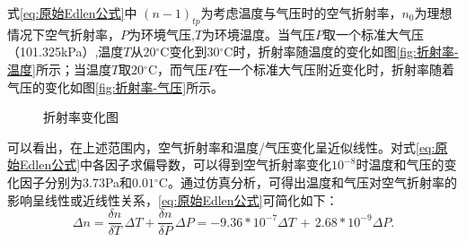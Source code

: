 式\eqref{eq:原始Edlen公式}中 \((n-1)_{tp}\)为考虑温度与气压时的空气折射率，\(n_0\)为理想情况下空气折射率，\(P\)为环境气压,\(T\)为环境温度。当气压\(P\)取一个标准大气压（101.325kPa）,温度\(T\)从\(20\)$^{\circ} \mathrm{C}$变化到\(30\)$^{\circ} \mathrm{C}$时，折射率随温度的变化如图\ref{fig:折射率-温度}所示；当温度\(T\)取\(20\)$^{\circ} \mathrm{C}$，而气压\(P\)在一个标准大气压附近变化时，折射率随着气压的变化如图\ref{fig:折射率-气压}所示。
\begin{figure}[htb]
    \centering
    \caption{折射率变化图}
    \label{fig:折射率变化图}
  \end{figure}

可以看出，在上述范围内，空气折射率和温度/气压变化呈近似线性\cite{李博2021温度对激光干涉法测量气体动态压力的影响}。对式\eqref{eq:原始Edlen公式}中各因子求偏导数，可以得到空气折射率变化\(10^{-8}\)时温度和气压的变化因子分别为3.73Pa和\(0.01\)$^{\circ} \mathrm{C}$\cite{2015Approach}。通过仿真分析，可得出温度和气压对空气折射率的影响呈线性或近线性关系，\eqref{eq:原始Edlen公式}可简化如下\cite{elden公式法在双频激光干涉仪测量系统的应用}：
\begin{equation}\label{eq:线性形式的Edlen公式}
    \Delta n=\frac{\delta n}{\delta T}\,\Delta T+\frac{\delta n}{\delta P}\,\Delta P
    =-9.36*10^{-7}\Delta T\,+\,2.68*10^{-9}\Delta P.
    \end{equation}

